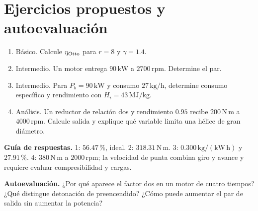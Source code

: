 \section{Ejercicios propuestos y autoevaluación}
\begin{enumerate}
\item Básico. Calcule $\eta_{\rm Otto}$ para $r=8$ y $\gamma=1.4$.
\item Intermedio. Un motor entrega $90\,\mathrm{kW}$ a $2700\,\mathrm{rpm}$. Determine el par.
\item Intermedio. Para $P_b=90\,\mathrm{kW}$ y consumo $27\,\mathrm{kg/h}$, determine consumo específico y rendimiento con $H_i=43\,\mathrm{MJ/kg}$.
\item Análisis. Un reductor de relación dos y rendimiento $0.95$ recibe $200\,\mathrm{N\,m}$ a $4000\,\mathrm{rpm}$. Calcule salida y explique qué variable limita una hélice de gran diámetro.
\end{enumerate}
\textbf{Guía de respuestas.} 1: $56.47\,\text{\%}$, ideal. 2: $318.31\,\mathrm{N\,m}$. 3: $0.300\,\mathrm{kg/(kW\,h)}$ y $27.91\,\text{\%}$. 4: $380\,\mathrm{N\,m}$ a $2000\,\mathrm{rpm}$; la velocidad de punta combina giro y avance y requiere evaluar compresibilidad y cargas.

\textbf{Autoevaluación.} ¿Por qué aparece el factor dos en un motor de cuatro tiempos? ¿Qué distingue detonación de preencendido? ¿Cómo puede aumentar el par de salida sin aumentar la potencia?


\studiumchaptercheck
